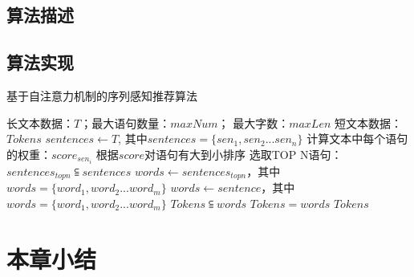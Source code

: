 \subsection{算法描述}


\subsection{算法实现}
\begin{algorithm}[htbp]
	\caption{基于自注意力机制的序列感知推荐算法}
	\label{alg:self-attention}
		\begin{algorithmic}[1]
			\REQUIRE 长文本数据：$T$；最大语句数量：$maxNum$； 最大字数：$maxLen$
			\ENSURE 短文本数据：$Tokens$
			\STATE $sentences \leftarrow T$, 其中$sentences=\{sen_{1}, sen_{2}...sen_{n}\}$
			    \STATE 计算文本中每个语句的权重：$score_{sen_{i}}$
			  \ENDFOR
			  \STATE 根据$score$对语句有大到小排序
			  \STATE 选取TOP N语句：$sentences_{topn} \subseteqq sentences$
			  \STATE $words \leftarrow sentences_{topn}$，其中 $words=\{word_{1}, word_{2}...word_{m}\}$
			\ELSE
			  \STATE $words \leftarrow sentence$，其中 $words=\{word_{1}, word_{2}...word_{m}\}$
			\ENDIF
			  \STATE $Tokens \subseteqq words$
			\ELSE
			  \STATE $Tokens = words $
			\ENDIF
			\RETURN $Tokens$
		\end{algorithmic}
\end{algorithm}


\section{本章小结}



